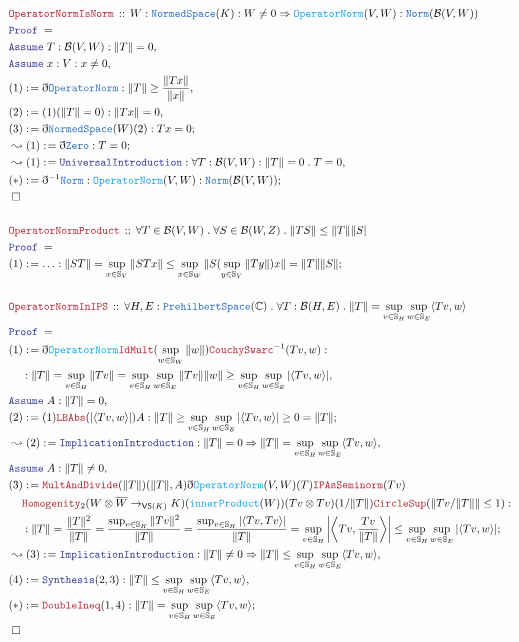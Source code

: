 \documentclass[12pt]{scrartcl}
\newcommand{\TYPE}[1]{\textcolor{NavyBlue}{\mathtt{#1}}}
\newcommand{\FUNC}[1]{\textcolor{Cerulean}{\mathtt{#1}}}
\newcommand{\LOGIC}[1]{\textcolor{Blue}{\mathtt{#1}}}
\newcommand{\THM}[1]{\textcolor{Maroon}{\mathtt{#1}}}
\renewcommand{\.}{\; . \;}
\newcommand{\de}{: \kern 0.1pc =}
\newcommand{\Theorem}[2]{& \THM{#1} \, :: \, #2 \\ & \Proof = \\ }
\newcommand{\NewLine}{\\ & \kern 1pc}
\newcommand{\Page}[1]{\begin{align*} #1 \end{align*} \newpage   }
\newcommand{ \bd }{ \ByDef }
\newcommand{\Say}[3]{& #1 \de #2 : #3, \\}
\newcommand{\Conclude}[3]{& #1 \de #2 : #3; \\}
\newcommand{\Derive}[3]{& \leadsto #1 \de #2 : #3, \\}
\newcommand{\DeriveConclude}[3]{& \leadsto #1 \de #2 : #3 ; \\}
\newcommand{\A}{\LOGIC{Assume} \;}
\newcommand{\Assume}[2]{& \A #1 : #2, \\}
\newcommand{\QED}{\; \square}
\newcommand{\EndProof}{& \QED \\}
\newcommand{\ByDef}{\eth}
\newcommand{\Proof}{\LOGIC{Proof} \; }
\newcommand{\NS}{\TYPE{NormedSpace}} %
\newcommand{\B}{\mathcal{B}}
\begin{document}
 \Page{
  \Theorem{OperatorNormIsNorm}{ 
   W : \NS(K) : W \neq 0 \Rightarrow  \FUNC{OperatorNorm}(V,W) : \TYPE{Norm}(\B(V,W)) 
  }
  \Assume{T}{\B(V,W) : \| T \| = 0} 
  \Assume{x}{V : x \neq 0 }
  \Say{ (1)  }{  \bd \TYPE{OperatorNorm} }{ \| T \| \ge \frac{ \| T x \|}{ \| x \| } }
  \Say{(2)}{ (1)(\| T \| = 0) }{  \| T  x \| = 0 }
  \Conclude{(3)}{ \bd \NS(W) (2)  }{ Tx = 0}
  \DeriveConclude{(1)}{\bd \TYPE{Zero}}{ T = 0 }
  \Derive{(1)}{ \LOGIC{UniversalIntroduction}}{ \forall T : \B(V,W) : \| T \| = 0  \. T = 0 }
  \Conclude{(*)}{ \bd^{-1}\TYPE{Norm}}{ \FUNC{OperatorNorm}(V,W) : \TYPE{Norm}(\B(V,W)) }
  \EndProof
  \\
  \Theorem{OperatorNormProduct}{\forall T \in \B(V,W) \. \forall S \in \B(W,Z) \. \| T S \| \le \| T \| \|S| }
  \Conclude{(1)}{\ldots}{ \| ST \| =
  \sup_{x \in \mathbb{S}_V} \| STx \| \le \sup_{x \in \mathbb{S}_W}
   \| S (\sup_{y \in \mathbb{S}_V } \| Ty \|)  x   \| = \| T \| \| S \|    
  }
  \\
  \Theorem{OperatorNormInIPS}{\forall H, E : \TYPE{PrehilbertSpace}(\mathbb{C}) 
  \.  \forall T : \B(H,E) \.  \| T \| = 
  \sup_{v \in \mathbb{S}_H} \sup_{w \in \mathbb{S}_E} \langle Tv , w \rangle 
  }
  \Say{(1)}{\bd \FUNC{OperatorNorm}\THM{IdMult}( \sup_{w \in \mathbb{S}_W} \| w \|)
   \THM{CouchySwarc}^{-1}(Tv,w)}
  {  \NewLine :\| T \| =  \sup_{v \in \mathbb{S}_H} \| Tv \|  
   =  \sup_{v \in \mathbb{S}_H} \sup_{w \in \mathbb{S}_E} \| Tv \| \| w \| \ge
      \sup_{v \in \mathbb{S}_H} \sup_{w \in \mathbb{S}_E} |\langle Tv , w \rangle |
     }
  \Assume{A}{\| T \| = 0}
  \Conclude{(2)}{  (1)\THM{LBAbs}( |\langle Tv, w \rangle |  )A }{ \| T \| \ge 
  \sup_{v \in \mathbb{S}_H} \sup_{w \in \mathbb{S}_E} |\langle Tv , w \rangle | \ge 0 = \| T \|
    }
  \Derive{(2)}{\LOGIC{ImplicationIntroduction}}{\| T \| = 0 \Rightarrow
   \| T \| = 
  \sup_{v \in \mathbb{S}_H} \sup_{w \in \mathbb{S}_E} \langle Tv , w \rangle }
  \Assume{A}{\| T \| \neq 0}
  \Conclude{(3)}{ \THM{MultAndDivide}(\|T\|)(\|T\|,A)\bd \FUNC{OperatorNorm}(V,W)(T)\THM{IPAsSeminorm}(Tv) \NewLine
    \THM{Homogenity}_2(W \otimes  \overline{W} \to_{\mathsf{VS}(K)} K)
    (\FUNC{innerProduct}(W))(Tv \otimes Tv)(1 / \| T \|)\THM{CircleSup}( \| Tv/ \| T \| \| \le 1)  
   }
  {   \NewLine : \| T \| =  \frac{\| T \|^2}{\| T \|} 
      = \frac{ \sup_{v \in \mathbb{S}_H} \| T v \|^2 }{\| T  \|}
      =       \frac{ \sup_{v \in \mathbb{S}_H} |\langle Tv, Tv \rangle|}{ \|T \|}
      = 
      \sup_{v \in \mathbb{S}_H} \left | \left \langle Tv , \frac{Tv}{\| T \|} 
       \right \rangle \right |
      \le   \sup_{v \in \mathbb{S}_H} \sup_{w \in \mathbb{S}_E} |\langle Tv , w \rangle|     
    }  
  \Derive{(3)}{\LOGIC{ImplicationIntroduction}}{\| T \| \neq 0 \Rightarrow
   \| T \| \le
  \sup_{v \in \mathbb{S}_H} \sup_{w \in \mathbb{S}_E} \langle Tv , w \rangle }
  \Say{(4)}{\LOGIC{Synthesis}(2,3)}
  {\| T \| \le
  \sup_{v \in \mathbb{S}_H} \sup_{w \in \mathbb{S}_E} \langle Tv , w \rangle }
  \Conclude{(*)}{\THM{DoubleIneq}(1,4)}{ \| T \| = 
  \sup_{v \in \mathbb{S}_H} \sup_{w \in \mathbb{S}_E} \langle Tv , w \rangle }
  \EndProof
 }
\end{document}

